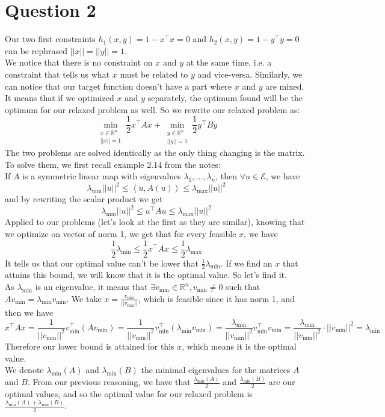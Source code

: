 \documentclass{article}
\newcommand{\R}{\mathbb{R}}
\newcommand{\tp}{^\top}
\begin{document}
\section*{Question 2}

Our two first constraints $h_1(x,y)=1-x\tp x =0$ and $h_2(x,y)=1-y\tp y =0$ can be rephrased $||x||=||y||=1$.\\
We notice that there is no constraint on $x$ and $y$ at the same time, i.e. a constraint that tells us what $x$ must be related to $y$ and vice-versa. Similarly, we can notice that our target function doesn't have a part where $x$ and $y$ are mixed.\\
It means that if we optimized $x$ and $y$ separately, the optimum found will be the optimum for our relaxed problem as well. So we rewrite our relaxed problem as:
$$\min_{\substack{x\in \R^n\\ ||x||=1}}  \frac{1}{2} x\tp A x +\min_{\substack{y \in \R^n\\ ||y||=1}} \frac{1}{2} y\tp B y$$
The two problems are solved identically as the only thing changing is the matrix. To solve them, we first recall example 2.14 from the notes:\\
If $A$ is a symmetric linear map with eigenvalues $\lambda_1, ...,\lambda_n$, then $\forall u \in \mathcal{E}$, we have $$\lambda_{\min} ||u||^2 \leq \left< u, A(u)\right>\leq \lambda_{\max}||u||^2$$
and by rewriting the scalar product we get 
$$\lambda_{\min} ||u||^2 \leq u\tp A u \leq \lambda_{\max} ||u||^2$$
Applied to our problems (let's look at the first as they are similar), knowing that we optimize on vector of norm 1, we get that for every feasible $x$, we have
$$\frac{1}{2}\lambda_{\min}  \leq\frac{1}{2} x\tp A x \leq\frac{1}{2} \lambda_{\max} $$
It tells us that our optimal value can't be lower that $\frac{1}{2} \lambda_{\min}$. If we find an $x$ that attains this bound, we will know that it is the optimal value. So let's find it.\\
As $\lambda_{\min}$ is an eigenvalue, it means that $\exists v_{\min} \in \R^n, v_{\min} \neq 0$ such that $A v_{\min}=\lambda_{\min} v_{\min}$. We take $x=\frac{v_{\min}}{||v_{\min}||}$, which is feasible since it has norm 1, and then we have
$$x\tp A x =\frac{1}{||v_{\min}||^2} v_{\min}\tp \left( A v_{\min} \right)=\frac{1}{||v_{\min}||^2} v_{\min}\tp (\lambda_{\min} v_{\min})=\frac{\lambda_{\min}}{||v_{\min}||^2} v_{\min}\tp v_{\min}=\frac{\lambda_{\min}}{||v_{\min}||^2} \cdot ||v_{\min}||^2=\lambda_{\min}$$
Therefore our lower bound is attained for this $x$, which means it is the optimal value.\\
We denote $\lambda_{\min} (A)$ and $\lambda_{\min} (B)$ the minimal eigenvalues for the matrices $A$ and $B$. From our previous reasoning, we have that $\frac{\lambda_{\min} (A)}{2}$ and $\frac{\lambda_{\min} (B)}{2}$ are our optimal values, and so the optimal value for our relaxed problem is $\frac{\lambda_{\min} (A)+\lambda_{\min} (B)}{2}$.
\end{document}
